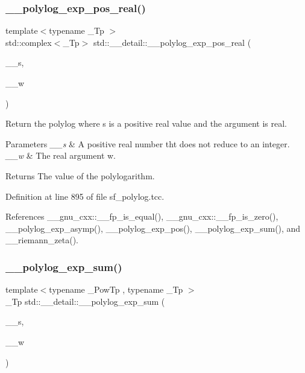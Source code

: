 \subsubsection{\texorpdfstring{\+\_\+\+\_\+polylog\+\_\+exp\+\_\+pos\+\_\+real()}{\_\_polylog\_exp\_pos\_real()}\hspace{0.1cm}{\footnotesize\ttfamily [2/2]}}
{\footnotesize\ttfamily template$<$typename \+\_\+\+Tp $>$ \\
std\+::complex$<$\+\_\+\+Tp$>$ std\+::\+\_\+\+\_\+detail\+::\+\_\+\+\_\+polylog\+\_\+exp\+\_\+pos\+\_\+real (\begin{DoxyParamCaption}\item[{\+\_\+\+Tp}]{\+\_\+\+\_\+s,  }\item[{\+\_\+\+Tp}]{\+\_\+\+\_\+w }\end{DoxyParamCaption})}

Return the polylog where s is a positive real value and the argument is real.


\begin{DoxyParams}{Parameters}
{\em \+\_\+\+\_\+s} & A positive real number tht does not reduce to an integer. \\
\hline
{\em \+\_\+\+\_\+w} & The real argument w. \\
\hline
\end{DoxyParams}
\begin{DoxyReturn}{Returns}
The value of the polylogarithm. 
\end{DoxyReturn}


Definition at line 895 of file sf\+\_\+polylog.\+tcc.



References \+\_\+\+\_\+gnu\+\_\+cxx\+::\+\_\+\+\_\+fp\+\_\+is\+\_\+equal(), \+\_\+\+\_\+gnu\+\_\+cxx\+::\+\_\+\+\_\+fp\+\_\+is\+\_\+zero(), \+\_\+\+\_\+polylog\+\_\+exp\+\_\+asymp(), \+\_\+\+\_\+polylog\+\_\+exp\+\_\+pos(), \+\_\+\+\_\+polylog\+\_\+exp\+\_\+sum(), and \+\_\+\+\_\+riemann\+\_\+zeta().

\mbox{\label{namespacestd_1_1____detail_acbdb1ad0debb8c919b4dcb1589af734c}} 
\subsubsection{\texorpdfstring{\+\_\+\+\_\+polylog\+\_\+exp\+\_\+sum()}{\_\_polylog\_exp\_sum()}}
{\footnotesize\ttfamily template$<$typename \+\_\+\+Pow\+Tp , typename \+\_\+\+Tp $>$ \\
\+\_\+\+Tp std\+::\+\_\+\+\_\+detail\+::\+\_\+\+\_\+polylog\+\_\+exp\+\_\+sum (\begin{DoxyParamCaption}\item[{\+\_\+\+Pow\+Tp}]{\+\_\+\+\_\+s,  }\item[{\+\_\+\+Tp}]{\+\_\+\+\_\+w }\end{DoxyParamCaption})}

